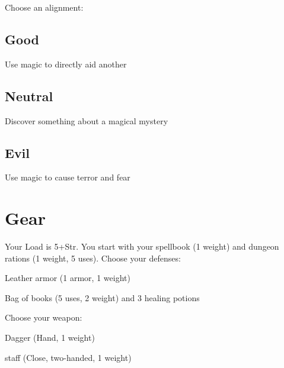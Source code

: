\startInstructionsAfterHeader
Choose an alignment:
\stopInstructionsAfterHeader
       

         
\subsection{Good}   
         

Use magic to directly aid another

         
\subsection{Neutral}   
         

Discover something about a magical mystery

         
\subsection{Evil}   
         

Use magic to cause terror and fear

       

       
\section{Gear}   
       

         

Your Load is 5+Str. You start with your spellbook (1 weight) and dungeon rations (1 weight, 5 uses). Choose your defenses:

         
\startitemize[1,packed]
           
\item Leather armor (1 armor, 1 weight)

           
\item Bag of books (5 uses, 2 weight) and 3 healing potions

         
\stopitemize
         

Choose your weapon:

         
\startitemize[1,packed]
           
\item Dagger (Hand, 1 weight)

           
\item staff (Close, two-handed, 1 weight)

         
\stopitemize
         


